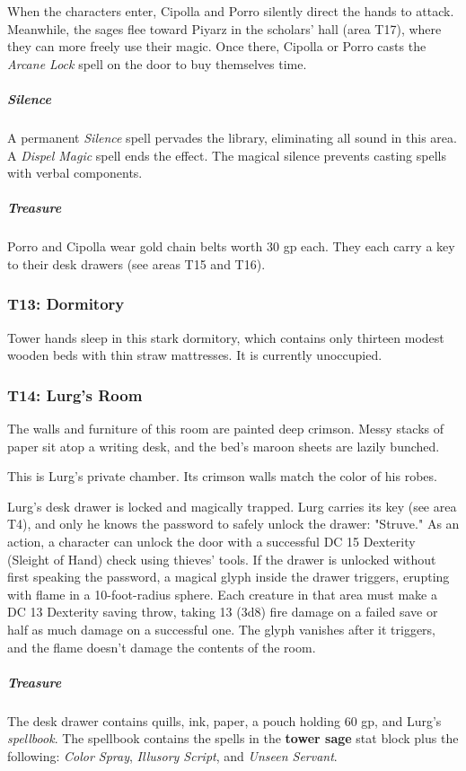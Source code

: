 \documentclass[10pt,a4paper,twoside,bg=print,twocolumn,openany,nodeprecatedcode]{dndbook}
\begin{document}
When the characters enter, Cipolla and Porro silently direct the hands to attack. Meanwhile, the sages flee toward Piyarz in the scholars' hall (area T17), where they can more freely use their magic. Once there, Cipolla or Porro casts the \textit{Arcane Lock} spell on the door to buy themselves time.

\subparagraph{Silence}
A permanent \textit{Silence} spell pervades the library, eliminating all sound in this area. A \textit{Dispel Magic} spell ends the effect. The magical silence prevents casting spells with verbal components.

\subparagraph{Treasure}
Porro and Cipolla wear gold chain belts worth 30 gp each. They each carry a key to their desk drawers (see areas T15 and T16).

\subsubsection{T13: Dormitory}
Tower hands sleep in this stark dormitory, which contains only thirteen modest wooden beds with thin straw mattresses. It is currently unoccupied.

\subsubsection{T14: Lurg's Room}
\begin{DndReadAloud}{}
The walls and furniture of this room are painted deep crimson. Messy stacks of paper sit atop a writing desk, and the bed's maroon sheets are lazily bunched.

\end{DndReadAloud}

This is Lurg's private chamber. Its crimson walls match the color of his robes.

Lurg's desk drawer is locked and magically trapped. Lurg carries its key (see area T4), and only he knows the password to safely unlock the drawer: "Struve." As an action, a character can unlock the door with a successful DC 15 Dexterity (Sleight of Hand) check using thieves' tools. If the drawer is unlocked without first speaking the password, a magical glyph inside the drawer triggers, erupting with flame in a 10-foot-radius sphere. Each creature in that area must make a DC 13 Dexterity saving throw, taking 13 (3d8) fire damage on a failed save or half as much damage on a successful one. The glyph vanishes after it triggers, and the flame doesn't damage the contents of the room.

\subparagraph{Treasure}
The desk drawer contains quills, ink, paper, a pouch holding 60 gp, and Lurg's \textit{spellbook}. The spellbook contains the spells in the \textbf{tower sage} stat block plus the following: \textit{Color Spray}, \textit{Illusory Script}, and \textit{Unseen Servant}.
\end{document}
